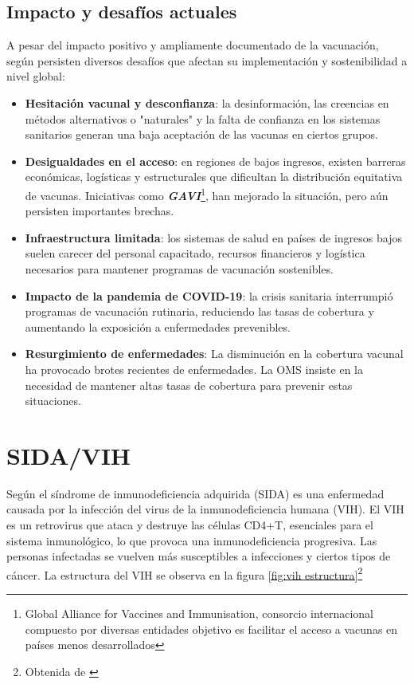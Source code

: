 \subsection{Impacto y desafíos actuales}
A pesar del impacto positivo y ampliamente documentado de la vacunación, según \cite{lindstrand2021world}persisten diversos desafíos que afectan su implementación y sostenibilidad a nivel global:
\begin{itemize}
    \item \textbf{Hesitación vacunal y desconfianza}: la desinformación, las creencias en métodos alternativos o "naturales" y la falta de confianza en los sistemas sanitarios generan una baja aceptación de las vacunas en ciertos grupos. 
    \item \textbf{Desigualdades en el acceso}: en regiones de bajos ingresos, existen barreras económicas, logísticas y estructurales que dificultan la distribución equitativa de vacunas. Iniciativas como \textbf{\textit{GAVI}}\footnote{Global Alliance for Vaccines and Immunisation, consorcio internacional compuesto por diversas entidades objetivo es facilitar el acceso a vacunas en países menos desarrollados}, han mejorado la situación, pero aún persisten importantes brechas.
    \item \textbf{Infraestructura limitada}: los sistemas de salud en países de ingresos bajos suelen carecer del personal capacitado, recursos financieros y logística necesarios para mantener programas de vacunación sostenibles.
    \item \textbf{Impacto de la pandemia de COVID-19}: la crisis sanitaria interrumpió programas de vacunación rutinaria, reduciendo las tasas de cobertura y aumentando la exposición a enfermedades prevenibles.
    \item \textbf{Resurgimiento de enfermedades}: La disminución en la cobertura vacunal ha provocado brotes recientes de enfermedades. La OMS insiste en la necesidad de mantener altas tasas de cobertura para prevenir estas situaciones.
\end{itemize}



\section{SIDA/VIH}
Según \cite{sudharshan2008introduction} el síndrome de inmunodeficiencia adquirida (SIDA)  es una enfermedad causada por la infección del virus de la inmunodeficiencia humana (VIH). El VIH es un retrovirus que ataca y destruye las células CD4+T, esenciales para el sistema inmunológico, lo que provoca una inmunodeficiencia progresiva. Las personas infectadas se vuelven más susceptibles a infecciones y ciertos tipos de cáncer. La estructura del VIH se observa en la figura \ref{fig:vih estructura}\footnote{Obtenida de \cite{infosida_vih}}

